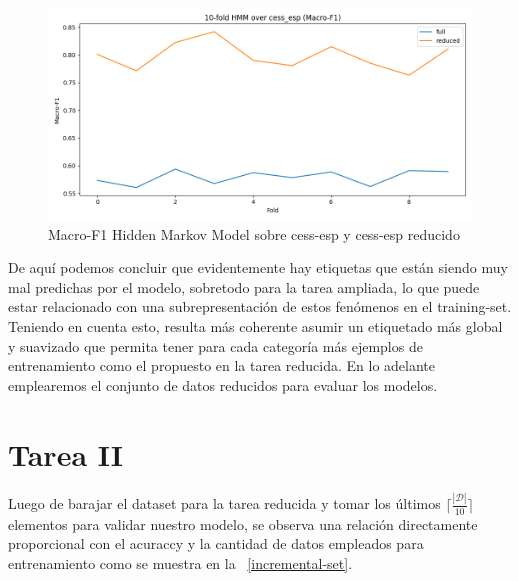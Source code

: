 \documentclass[11pt,a4paper]{report}
\begin{document}
	\begin{figure}[!thb]
		\begin{center}
			\includegraphics[scale=0.6]{images/macro-f1-hmm.png}
		\end{center}
		\caption{Macro-F1 Hidden Markov Model sobre cess-esp y cess-esp reducido}
		\label{macro-f1-hmm}
	\end{figure}

	De aquí podemos concluir que evidentemente hay etiquetas que están siendo muy mal predichas por el modelo, sobretodo para la tarea ampliada, lo que puede estar relacionado con una subrepresentación de estos fenómenos en el training-set. Teniendo en cuenta esto, resulta más coherente asumir un etiquetado más global y suavizado que permita tener para cada categoría más ejemplos de entrenamiento como el propuesto en la tarea reducida. En lo adelante emplearemos el conjunto de datos reducidos para evaluar los modelos.
	
	\section*{Tarea II}
	
	Luego de barajar el dataset para la tarea reducida y tomar los últimos $\Big\lceil \frac{|\mathcal{D}|}{10}\Big\rceil$ elementos para validar nuestro modelo, se observa una relación directamente proporcional con el acuraccy y la cantidad de datos empleados para entrenamiento como se muestra en la \figurename~\ref{incremental-set}.
		
\end{document}
